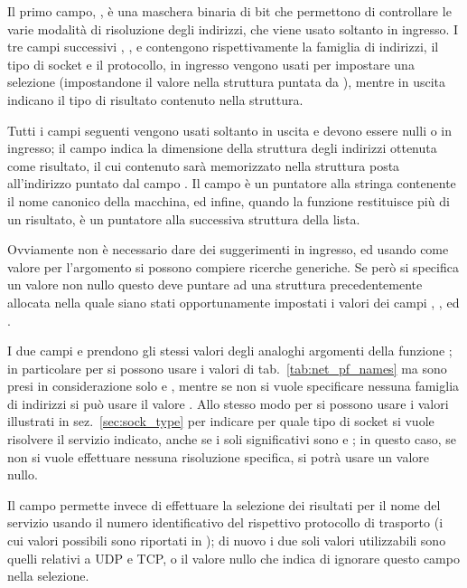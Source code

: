 Il primo campo, , è una maschera binaria di bit che
permettono di controllare le varie modalità di risoluzione degli indirizzi,
che viene usato soltanto in ingresso. I tre campi successivi ,
, e  contengono rispettivamente la
famiglia di indirizzi, il tipo di socket e il protocollo, in ingresso vengono
usati per impostare una selezione (impostandone il valore nella struttura
puntata da ), mentre in uscita indicano il tipo di risultato
contenuto nella struttura.

Tutti i campi seguenti vengono usati soltanto in uscita e devono essere nulli
o  in ingresso; il campo  indica la dimensione
della struttura degli indirizzi ottenuta come risultato, il cui contenuto sarà
memorizzato nella struttura  posta all'indirizzo puntato dal
campo . Il campo  è un puntatore alla stringa
contenente il nome canonico della macchina, ed infine, quando la funzione
restituisce più di un risultato,  è un puntatore alla successiva
struttura  della lista.

Ovviamente non è necessario dare dei suggerimenti in ingresso, ed usando
 come valore per l'argomento  si possono compiere
ricerche generiche.  Se però si specifica un valore non nullo questo deve
puntare ad una struttura  precedentemente allocata nella
quale siano stati opportunamente impostati i valori dei campi
, ,  ed .

I due campi  e  prendono gli stessi valori
degli analoghi argomenti della funzione ; in particolare per
 si possono usare i valori di tab.~\ref{tab:net_pf_names} ma
sono presi in considerazione solo  e , mentre
se non si vuole specificare nessuna famiglia di indirizzi si può usare il
valore .  Allo stesso modo per  si possono
usare i valori illustrati in sez.~\ref{sec:sock_type} per indicare per quale
tipo di socket si vuole risolvere il servizio indicato, anche se i soli
significativi sono  e ; in questo caso,
se non si vuole effettuare nessuna risoluzione specifica, si potrà usare un
valore nullo.

Il campo  permette invece di effettuare la selezione dei
risultati per il nome del servizio usando il numero identificativo del
rispettivo protocollo di trasporto (i cui valori possibili sono riportati in
); di nuovo i due soli valori utilizzabili sono quelli
relativi a UDP e TCP, o il valore nullo che indica di ignorare questo campo
nella selezione.

